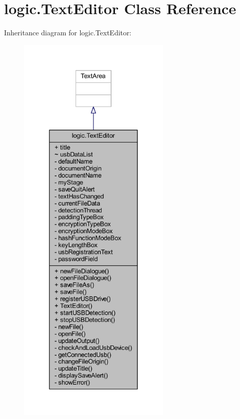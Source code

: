 \hypertarget{classlogic_1_1_text_editor}{}\section{logic.\+Text\+Editor Class Reference}
\label{classlogic_1_1_text_editor}


Inheritance diagram for logic.\+Text\+Editor\+:\nopagebreak
\begin{figure}[H]
\begin{center}
\leavevmode
\includegraphics[height=550pt]{classlogic_1_1_text_editor__inherit__graph}
\end{center}
\end{figure}


